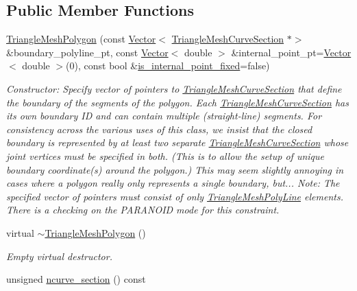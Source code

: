 \subsection*{Public Member Functions}
\begin{DoxyCompactItemize}
\item 
\hyperlink{classoomph_1_1TriangleMeshPolygon_a779958aa48492a70dd39c3d323e43aca}{Triangle\+Mesh\+Polygon} (const \hyperlink{classoomph_1_1Vector}{Vector}$<$ \hyperlink{classoomph_1_1TriangleMeshCurveSection}{Triangle\+Mesh\+Curve\+Section} $\ast$$>$ \&boundary\+\_\+polyline\+\_\+pt, const \hyperlink{classoomph_1_1Vector}{Vector}$<$ double $>$ \&internal\+\_\+point\+\_\+pt=\hyperlink{classoomph_1_1Vector}{Vector}$<$ double $>$(0), const bool \&\hyperlink{classoomph_1_1TriangleMeshClosedCurve_a5d48fa39b4cde1ba1bdba129a1587f2f}{is\+\_\+internal\+\_\+point\+\_\+fixed}=false)
\begin{DoxyCompactList}\small\item\em Constructor\+: Specify vector of pointers to \hyperlink{classoomph_1_1TriangleMeshCurveSection}{Triangle\+Mesh\+Curve\+Section} that define the boundary of the segments of the polygon. Each \hyperlink{classoomph_1_1TriangleMeshCurveSection}{Triangle\+Mesh\+Curve\+Section} has its own boundary ID and can contain multiple (straight-\/line) segments. For consistency across the various uses of this class, we insist that the closed boundary is represented by at least two separate \hyperlink{classoomph_1_1TriangleMeshCurveSection}{Triangle\+Mesh\+Curve\+Section} whose joint vertices must be specified in both. (This is to allow the setup of unique boundary coordinate(s) around the polygon.) This may seem slightly annoying in cases where a polygon really only represents a single boundary, but... Note\+: The specified vector of pointers must consist of only \hyperlink{classoomph_1_1TriangleMeshPolyLine}{Triangle\+Mesh\+Poly\+Line} elements. There is a checking on the P\+A\+R\+A\+N\+O\+ID mode for this constraint. \end{DoxyCompactList}\item 
virtual \hyperlink{classoomph_1_1TriangleMeshPolygon_a88641d82d4b496ea61cce64045416e37}{$\sim$\+Triangle\+Mesh\+Polygon} ()
\begin{DoxyCompactList}\small\item\em Empty virtual destructor. \end{DoxyCompactList}\item 
unsigned \hyperlink{classoomph_1_1TriangleMeshPolygon_a6ef43be1b982a8dcc2f10545ab251bdb}{ncurve\+\_\+section} () const
$$
\end{DoxyCompactItemize}
